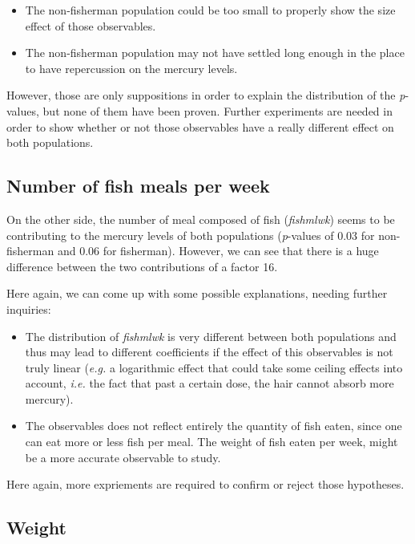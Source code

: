 \documentclass[12pt,]{article}
\providecommand{\tightlist}{%
  \setlength{\itemsep}{0pt}\setlength{\parskip}{0pt}}
\begin{document}
\begin{itemize}
\tightlist
\item
  The non-fisherman population could be too small to properly show the
  size effect of those observables.
\item
  The non-fisherman population may not have settled long enough in the
  place to have repercussion on the mercury levels.
\end{itemize}

However, those are only suppositions in order to explain the
distribution of the \emph{p}-values, but none of them have been proven.
Further experiments are needed in order to show whether or not those
observables have a really different effect on both populations.

\subsection{Number of fish meals per
week}\label{number-of-fish-meals-per-week}

On the other side, the number of meal composed of fish (\emph{fishmlwk})
seems to be contributing to the mercury levels of both populations
(\emph{p}-values of 0.03 for non-fisherman and 0.06 for fisherman).
However, we can see that there is a huge difference between the two
contributions of a factor 16.

Here again, we can come up with some possible explanations, needing
further inquiries:

\begin{itemize}
\item
  The distribution of \emph{fishmlwk} is very different between both
  populations and thus may lead to different coefficients if the effect
  of this observables is not truly linear (\emph{e.g.} a logarithmic
  effect that could take some ceiling effects into account, \emph{i.e.}
  the fact that past a certain dose, the hair cannot absorb more
  mercury).
\item
  The observables does not reflect entirely the quantity of fish eaten,
  since one can eat more or less fish per meal. The weight of fish eaten
  per week, might be a more accurate observable to study.
\end{itemize}

Here again, more expriements are required to confirm or reject those
hypotheses.

\subsection{Weight}\label{weight}
\end{document}
